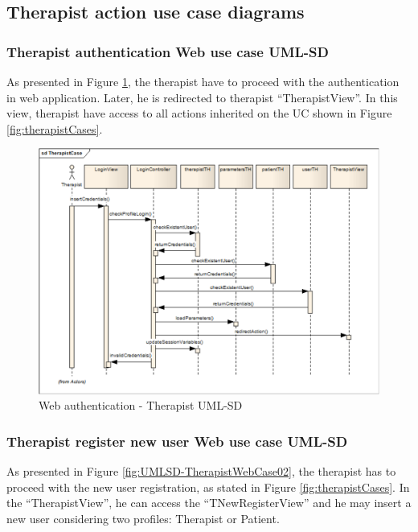 \subsection{Therapist action use case diagrams}
\subsubsection{Therapist authentication Web use case UML-SD}

As presented in Figure \ref{fig:UMLSD-TherapistWebCase01}, the therapist have to proceed with the authentication in web application. Later, he is redirected to therapist ``TherapistView''. In this view, therapist have access to all actions inherited on the UC shown in Figure \ref{fig:therapistCases}.

\begin{figure}[!hbt]
\begin{center}
\includegraphics[width=0.71 \textwidth]{img/cap4/UMLSD-TherapistWebCase01}
\caption{Web authentication - Therapist UML-SD}
\label{fig:UMLSD-TherapistWebCase01}
\end{center}
\end{figure} 

\subsubsection{Therapist register new user Web use case UML-SD}

As presented in Figure \ref{fig:UMLSD-TherapistWebCase02}, the therapist has to proceed with the new user registration, as stated in Figure \ref{fig:therapistCases}. In the ``TherapistView'', he can access the ``TNewRegisterView'' and he may insert a new user considering two profiles: Therapist or Patient. 

